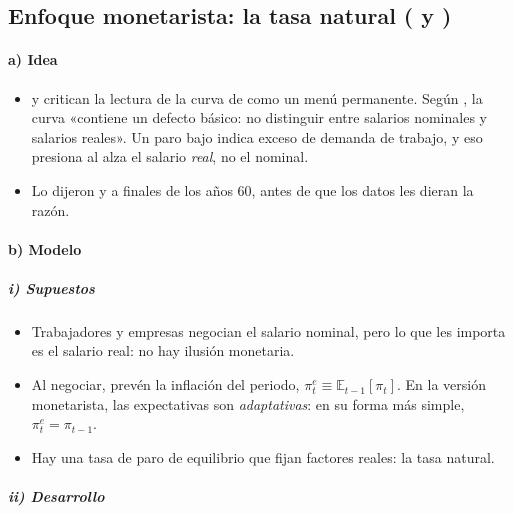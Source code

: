 \documentclass[11pt]{article}
\begin{document}
\subsection{Enfoque monetarista: la tasa natural ( y )}\label{sec:monetarista}

\paragraph{a) Idea}

\begin{itemize}
\item {} y  critican la lectura de la curva de  como un menú permanente. Según \textcite[8]{Friedman1968Role}, la curva «contiene un defecto básico: no distinguir entre salarios nominales y salarios reales». Un paro bajo indica exceso de demanda de trabajo, y eso presiona al alza el salario \emph{real}, no el nominal.
\item Lo dijeron \textcite{Phelps1967Phillips,Phelps1968Money} y \textcite{Friedman1968Role} a finales de los años 60, antes de que los datos les dieran la razón.
\end{itemize}

\paragraph{b) Modelo}

\subparagraph{i) Supuestos}

\begin{itemize}
\item Trabajadores y empresas negocian el salario nominal, pero lo que les importa es el salario real: no hay ilusión monetaria.
\item Al negociar, prevén la inflación del periodo, $\pi^e_t\equiv\mathbb{E}_{t-1}[\pi_t]$. En la versión monetarista, las expectativas son \emph{adaptativas}: en su forma más simple, $\pi^e_t=\pi_{t-1}$.
\item Hay una tasa de paro de equilibrio que fijan factores reales: la tasa natural.
\end{itemize}

\subparagraph{ii) Desarrollo}
\end{document}
